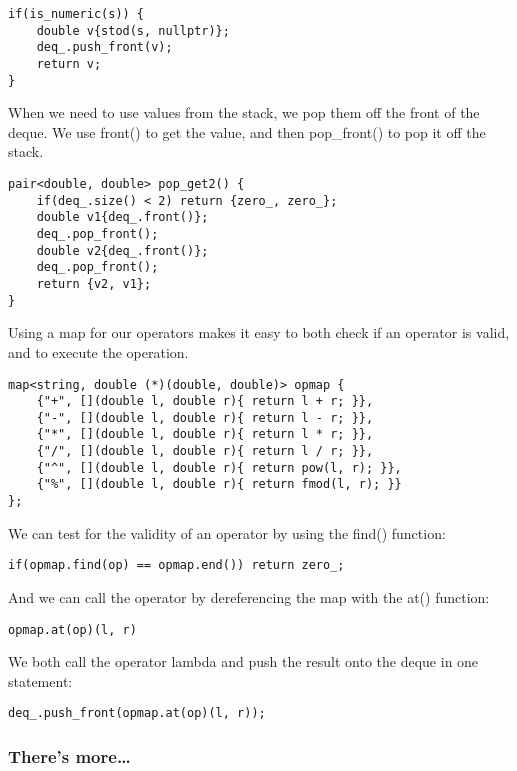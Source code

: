 \begin{lstlisting}[style=styleCXX]
if(is_numeric(s)) {
	double v{stod(s, nullptr)};
	deq_.push_front(v);
	return v;
}
\end{lstlisting}

When we need to use values from the stack, we pop them off the front of the deque. We use front() to get the value, and then pop\_front() to pop it off the stack.

\begin{lstlisting}[style=styleCXX]
pair<double, double> pop_get2() {
	if(deq_.size() < 2) return {zero_, zero_};
	double v1{deq_.front()};
	deq_.pop_front();
	double v2{deq_.front()};
	deq_.pop_front();
	return {v2, v1};
}
\end{lstlisting}

Using a map for our operators makes it easy to both check if an operator is valid, and to execute the operation.

\begin{lstlisting}[style=styleCXX]
map<string, double (*)(double, double)> opmap {
	{"+", [](double l, double r){ return l + r; }},
	{"-", [](double l, double r){ return l - r; }},
	{"*", [](double l, double r){ return l * r; }},
	{"/", [](double l, double r){ return l / r; }},
	{"^", [](double l, double r){ return pow(l, r); }},
	{"%", [](double l, double r){ return fmod(l, r); }}
};
\end{lstlisting}

We can test for the validity of an operator by using the find() function:

\begin{lstlisting}[style=styleCXX]
if(opmap.find(op) == opmap.end()) return zero_;
\end{lstlisting}

And we can call the operator by dereferencing the map with the at() function:

\begin{lstlisting}[style=styleCXX]
opmap.at(op)(l, r)
\end{lstlisting}

We both call the operator lambda and push the result onto the deque in one statement:

\begin{lstlisting}[style=styleCXX]
deq_.push_front(opmap.at(op)(l, r));
\end{lstlisting}

\subsubsection{There's more…}


